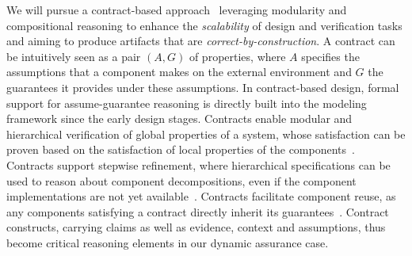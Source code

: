 We will pursue a contract-based approach~\cite{Nuzzo15b,Sangiovanni-Vincentelli2012a} leveraging modularity and compositional reasoning to enhance the \emph{scalability} of design and verification tasks and aiming to produce artifacts that are \emph{correct-by-construction}. 
A contract can be intuitively seen as a pair $(A,G)$ of properties, where $A$ specifies the assumptions that a component makes on the external environment and $G$ the guarantees it provides under these assumptions. In contract-based design, formal support for assume-guarantee reasoning is directly built into the modeling framework since the early design stages. Contracts enable modular and hierarchical verification of global properties of a system, whose satisfaction can be proven based on the satisfaction of local properties of the components~\cite{Cimatti15b}. Contracts support stepwise refinement, where hierarchical specifications can be used to reason about component decompositions, even if the component implementations are not yet available~\cite{Cimatti15b,Nuzzo14,Iannopollo14}. Contracts facilitate component reuse, as any components satisfying a contract directly inherit its guarantees~\cite{Iannopollo14}. Contract constructs, carrying claims as well as evidence, context and assumptions, thus become critical reasoning elements in our dynamic assurance case.

